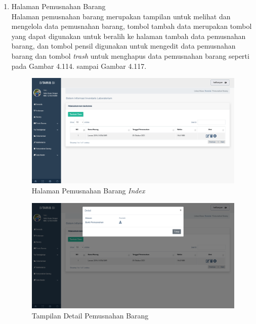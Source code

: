 \begin{enumerate}
  \item Halaman Pemusnahan Barang \\ Halaman pemusnahan barang merupakan tampilan untuk melihat dan mengelola data pemusnahan barang, tombol tambah data merupakan tombol yang dapat digunakan untuk beralih ke halaman tambah data pemusnahan barang, dan tombol pensil digunakan untuk mengedit data pemusnahan barang dan tombol \textit{trash} untuk menghapus data pemusnahan barang seperti pada Gambar 4.114. sampai Gambar 4.117.

        \begin{figure}
          \centering
          \includegraphics[width=0.82\linewidth]{konten//gambar/pemusnahan barang index.png}
          \caption{Halaman Pemusnahan Barang \textit{Index}}
          \label{fig:enter-label}
        \end{figure}

        \begin{figure}
          \centering
          \includegraphics[width=0.82\linewidth]{konten//gambar/pemusnahan barangdtl.png}
          \caption{Tampilan Detail Pemusnahan Barang}
          \label{fig:enter-label}
        \end{figure}


\end{enumerate}
